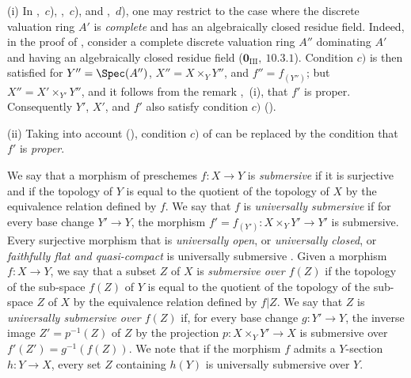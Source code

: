 \begin{remarks}[15.7.7]
\label{IV.15.7.7}
(i)
In ,~$c$), ,~$c$), and ,~$d$), one may restrict to the case where the discrete valuation ring $A'$ is \emph{complete} and has an algebraically closed residue field.
Indeed, in the proof of , consider a complete discrete valuation ring $A''$ dominating $A'$ and having an algebraically closed residue field ($\mathbf{0}_{\mathrm{III}},~10.3.1$). Condition $c)$ is then satisfied for $Y''=\Spec(A'')$, $X''=X\times_Y Y''$, and $f''=f_{(Y'')}$; but $X''=X'\times_{Y'}Y''$, and it follows from the remark ,~(i), that $f'$ is proper. Consequently $Y'$, $X'$, and $f'$ also satisfy condition $c)$ ().

(ii)
Taking into account (), condition $c)$ of  can be replaced by the condition that $f'$ is \emph{proper}.
\end{remarks}

\begin{env}[15.7.8]
\label{IV.15.7.8}
We say that a morphism of preschemes $f:X\to Y$ is \emph{submersive} if it is surjective and if the topology of $Y$ is equal to the quotient of the topology of $X$ by the equivalence relation defined by $f$.
We say that $f$ is \emph{universally submersive} if for every base change $Y'\to Y$, the morphism $f'=f_{(Y')}:X\times_Y Y'\to Y'$ is submersive.
Every surjective morphism that is \emph{universally open}, or \emph{universally closed}, or \emph{faithfully flat and quasi-compact} is universally submersive .
Given a morphism $f:X\to Y$, we say that a subset $Z$ of $X$ is \emph{submersive over $f(Z)$} if the topology of the sub-space $f(Z)$ of $Y$ is equal to the quotient of the topology of the sub-space $Z$ of $X$ by the equivalence relation defined by $f|Z$.
We say that $Z$ is \emph{universally submersive over $f(Z)$} if, for every base change $g:Y'\to Y$, the inverse image $Z'=p^{-1}(Z)$ of $Z$ by the projection $p:X\times_Y Y'\to X$ is submersive over $f'(Z')=g^{-1}(f(Z))$.
We note that if the morphism $f$ admits a $Y$-section $h:Y\to X$, every set $Z$ containing $h(Y)$ is universally submersive over $Y$.
\end{env}

